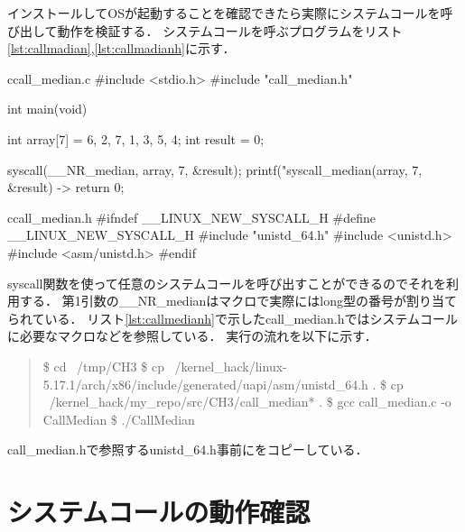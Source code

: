 インストールしてOSが起動することを確認できたら実際にシステムコールを呼び出して動作を検証する．
システムコールを呼ぶプログラムをリスト\ref{lst:callmadian},\ref{lst:callmadianh}に示す．
\begin{longlisting}
\begin{myminted}{c}{call\_median.c}
#include <stdio.h>
#include "call_median.h"

int main(void) {
    int array[7] = {6, 2, 7, 1, 3, 5, 4};
    int result = 0;

    syscall(__NR_median, array, 7, &result);
    printf("syscall_median(array, 7, &result) -> %
    return 0;
}
\end{myminted}
\caption{medianを呼ぶプログラム}
\label{lst:callmedian}
\end{longlisting}

\begin{longlisting}
\begin{myminted}{c}{call\_median.h}
#ifndef __LINUX_NEW_SYSCALL_H
#define __LINUX_NEW_SYSCALL_H
#include "unistd_64.h"
#include <unistd.h>
#include <asm/unistd.h>
#endif
\end{myminted}
\caption{call\_median.h}
\label{lst:callmedianh}
\end{longlisting}

syscall関数を使って任意のシステムコールを呼び出すことができるのでそれを利用する．
第1引数の\_\_NR\_medianはマクロで実際にはlong型の番号が割り当てられている．\cite{unistd32}
リスト\ref{lst:callmedianh}で示したcall\_median.hではシステムコールに必要なマクロなどを参照している．
実行の流れを以下に示す．

\begin{quote}
\$ cd ~/tmp/CH3
\$ cp ~/kernel\_hack/linux-5.17.1/arch/x86/include/generated/uapi/asm/unistd\_64.h .
\$ cp ~/kernel\_hack/my\_repo/src/CH3/call\_median* .
\$ gcc call\_median.c -o CallMedian
\$ ./CallMedian
\end{quote}

call\_median.hで参照するunistd\_64.h事前にをコピーしている．

\section{システムコールの動作確認}


